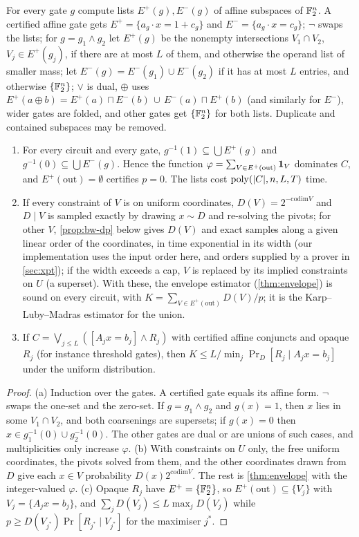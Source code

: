 \begin{theorem}\label{thm:affenv}
For every gate $g$ compute lists $E^+(g),E^-(g)$ of affine subspaces of $\mathbb{F}_2^n$. A
certified affine gate gets $E^+=\{a_g\cdot x=1+c_g\}$ and $E^-=\{a_g\cdot x=c_g\}$;
$\neg$ swaps the lists; for $g=g_1\wedge g_2$ let $E^+(g)$ be the nonempty
intersections $V_1\cap V_2$, $V_j\in E^+(g_j)$, if there are at most $L$ of them, and
otherwise the operand list of smaller mass; let $E^-(g)=E^-(g_1)\cup E^-(g_2)$ if it
has at most $L$ entries, and otherwise $\{\mathbb{F}_2^n\}$; $\vee$ is dual, $\oplus$ uses
$E^+(a\oplus b)=E^+(a)\sqcap E^-(b)\,\cup\,E^-(a)\sqcap E^+(b)$ (and similarly for
$E^-$), wider gates are folded, and other gates get $\{\mathbb{F}_2^n\}$ for both lists.
Duplicate and contained subspaces may be removed.
\begin{enumerate}[label=(\alph*)]
\item For every circuit and every gate, $g^{-1}(1)\subseteq\bigcup E^+(g)$ and
$g^{-1}(0)\subseteq\bigcup E^-(g)$. Hence the function
$\varphi=\sum_{V\in E^+(\mathrm{out})}\mathbf{1}_V$ dominates $C$, and
$E^+(\mathrm{out})=\emptyset$ certifies $p=0$. The lists cost
$\mathrm{poly}(|C|,n,L,T)$ time.
\item If every constraint of $V$ is on uniform coordinates, $D(V)=2^{-\mathrm{codim}V}$
and $D\mid V$ is sampled exactly by drawing $x\sim D$ and re-solving the pivots; for
other $V$, \cref{prop:bw-dp} below gives $D(V)$ and exact samples along a given linear
order of the coordinates, in time exponential in its width (our implementation uses
the input order here, and orders supplied by a prover in \cref{sec:xpt}); if the width
exceeds a cap, $V$ is replaced by its implied constraints on $U$ (a superset). With
these, the envelope estimator (\cref{thm:envelope}) is sound on
every circuit, with $K=\sum_{V\in E^+(\mathrm{out})}D(V)/p$; it is the
Karp--Luby--Madras estimator for the union.
\item If $C=\bigvee_{j\le L}([A_jx=b_j]\wedge R_j)$ with certified affine conjuncts and
opaque $R_j$ (for instance threshold gates), then $K\le L/\min_j\Pr_D[R_j\mid A_jx=b_j]$
under the uniform distribution.
\end{enumerate}
\end{theorem}

\begin{proof}
(a) Induction over the gates. A certified gate equals its affine form. $\neg$ swaps
the one-set and the zero-set. If $g=g_1\wedge g_2$ and $g(x)=1$, then $x$ lies in some
$V_1\cap V_2$, and both coarsenings are supersets; if $g(x)=0$ then $x\in g_1^{-1}(0)\cup
g_2^{-1}(0)$. The other gates are dual or are unions of such cases, and multiplicities
only increase $\varphi$. (b) With constraints on $U$ only, the free uniform coordinates,
the pivots solved from them, and the other coordinates drawn from $D$ give each $x\in
V$ probability $D(x)2^{\mathrm{codim}V}$. The rest is \cref{thm:envelope} with the
integer-valued $\varphi$. (c) Opaque $R_j$ have $E^+=\{\mathbb{F}_2^n\}$, so
$E^+(\mathrm{out})\subseteq\{V_j\}$ with $V_j=\{A_jx=b_j\}$, and
$\sum_jD(V_j)\le L\max_jD(V_j)$ while $p\ge D(V_{j^*})\Pr[R_{j^*}\mid V_{j^*}]$ for the
maximiser $j^*$.
\end{proof}


